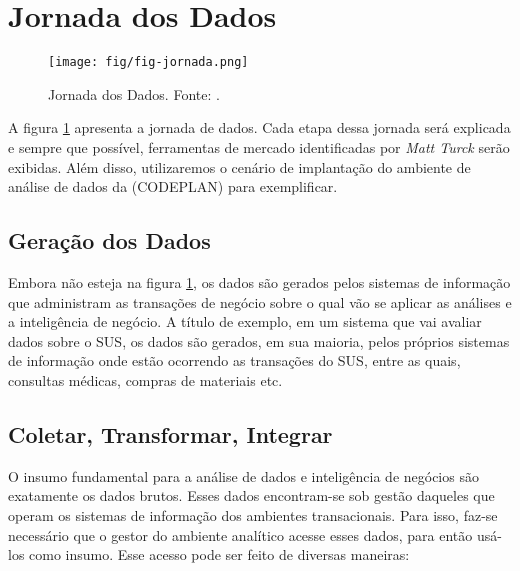 \section{Jornada dos Dados}    
\label{sub-jornadadosdados}

    \begin{figure}[htbp!]
        \centering
        \texttt{[image: fig/fig-jornada.png]}
        \caption{Jornada dos Dados. Fonte: \cite[adaptado]{a10:jornada}.}
        \label{fig:jornadadados}
    \end{figure}

    A figura \ref{fig:jornadadados} apresenta a jornada de dados. Cada etapa dessa jornada será explicada e sempre que possível, ferramentas de mercado identificadas por \emph{Matt Turck} \cite{mattturck:sheet} serão exibidas. Além disso, utilizaremos o cenário de implantação do ambiente de análise de dados da \CODEPLAN \xspace (CODEPLAN) para exemplificar. 

    \subsection{Geração dos Dados}

    Embora não esteja na figura \ref{fig:jornadadados}, os dados são gerados pelos sistemas de informação que administram as transações de negócio sobre o qual vão se aplicar as análises e a inteligência de negócio. A título de exemplo, em um sistema que vai avaliar dados sobre o SUS, os dados são gerados, em sua maioria, pelos próprios sistemas de informação onde estão ocorrendo as transações do SUS, entre as quais, consultas médicas, compras de materiais etc.

    \subsection{Coletar, Transformar, Integrar}\label{acessos-dados}
    
    O insumo fundamental para a análise de dados e inteligência de negócios são exatamente os dados brutos. Esses dados encontram-se sob gestão daqueles que operam os sistemas de informação dos ambientes transacionais. Para isso, faz-se necessário que o gestor do ambiente analítico acesse esses dados, para então usá-los como insumo. Esse acesso pode ser feito de diversas maneiras:

